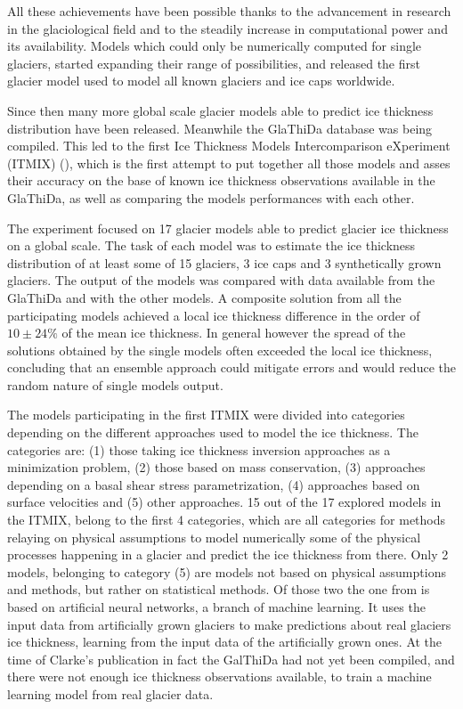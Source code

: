All these achievements have been possible thanks to the advancement in research in the glaciological field and to the steadily increase in computational power and its availability. Models which could only be numerically computed for single glaciers, started expanding their range of possibilities, and \citet{Huss2012} released the first glacier model used to model all known glaciers and ice caps worldwide.

Since then many more global scale glacier models able to predict ice thickness distribution have been released. Meanwhile the GlaThiDa database was being compiled. This led to the first Ice Thickness Models Intercomparison eXperiment (ITMIX) (\citet{Farinotti2017}), which is the first attempt to put together all those models and asses their accuracy on the base of known ice thickness observations available in the GlaThiDa, as well as comparing the models performances with each other. 

The experiment focused on 17 glacier models able to predict glacier ice thickness on a global scale. The task of each model was to estimate the ice thickness distribution of at least some of 15 glaciers, 3 ice caps and 3 synthetically grown glaciers. The output of the models was compared with data available from the GlaThiDa and with the other models. A composite solution from all the participating models achieved a local ice thickness difference in the order of $10 \pm 24\%$ of the mean ice thickness. In general however the spread of the solutions obtained by the single models often exceeded the local ice thickness, concluding that an ensemble approach could mitigate errors and would reduce the random nature of single models output.  

The models participating in the first ITMIX were divided into categories depending on the different approaches used to model the ice thickness. The categories are: (1) those taking ice thickness inversion approaches as a minimization problem, (2) those based on mass conservation,  (3) approaches depending on a basal shear stress parametrization, (4) approaches based on surface velocities and (5) other approaches. 15 out of the 17 explored models in the ITMIX, belong to the first 4 categories, which are all categories for methods relaying on physical assumptions to model numerically some of the physical processes happening in a glacier and predict the ice thickness from there. Only 2 models, belonging to category (5) are models not based on physical assumptions and methods, but rather on statistical methods. Of those two the one from \citet{Clarke2009} is based on artificial neural networks, a branch of machine learning. It uses the input data from artificially grown glaciers to make predictions about real glaciers ice thickness, learning from the input data of the artificially grown ones. At the time of Clarke's publication in fact the GalThiDa had not yet been compiled, and there were not enough ice thickness observations available, to train a machine learning model from real glacier data.

